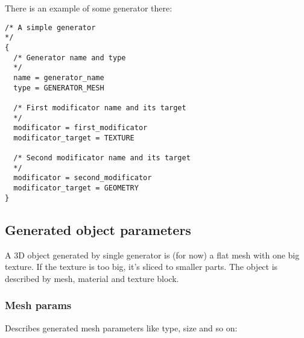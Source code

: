 \documentclass[11pt]{article}
\begin{document}
There is an example of some generator there: 

\begin{verbatim}
/* A simple generator
*/
{
  /* Generator name and type
  */
  name = generator_name
  type = GENERATOR_MESH

  /* First modificator name and its target
  */
  modificator = first_modificator
  modificator_target = TEXTURE
  
  /* Second modificator name and its target
  */
  modificator = second_modificator
  modificator_target = GEOMETRY
}
\end{verbatim}

\subsection{Generated object parameters}

A 3D object generated by single generator is (for now) a flat mesh with
one big texture. If the texture is too big, it's sliced to smaller parts.
The object is described by mesh, material and texture block.

\subsubsection{Mesh params}

Describes generated mesh parameters like type, size and so on:
\end{document}
